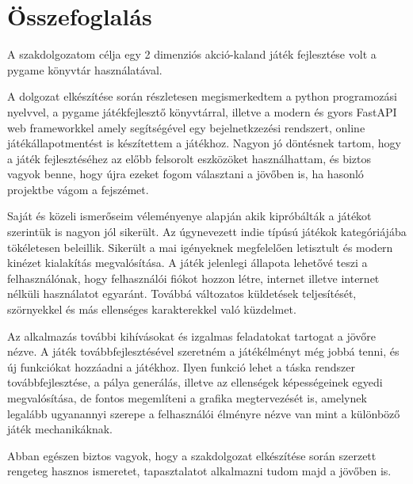 \chapter{Összefoglalás}

A szakdolgozatom célja egy 2 dimenziós akció-kaland játék fejlesztése volt a pygame könyvtár használatával.

A dolgozat elkészítése során részletesen megismerkedtem a python programozási nyelvvel, a pygame játékfejlesztő könyvtárral, illetve a modern és gyors FastAPI web frameworkkel amely segítségével egy bejelnetkzezési rendszert, online játékállapotmentést is készítettem a játékhoz. Nagyon jó döntésnek tartom, hogy a játék fejlesztéséhez az előbb felsorolt eszközöket használhattam, és biztos vagyok benne, hogy újra ezeket fogom választani a jövőben is, ha hasonló projektbe vágom a fejszémet.

Saját és közeli ismerőseim véleményenye alapján akik kipróbálták a játékot szerintük is nagyon jól sikerült. Az úgynevezett indie típúsú játékok kategóriájába tökéletesen beleillik. Sikerült a mai igényeknek megfelelően letisztult és modern kinézet kialakítás megvalósítása. A játék jelenlegi állapota lehetővé teszi a felhasználónak, hogy felhasználói fiókot hozzon létre, internet illetve internet nélküli használatot egyaránt. Továbbá változatos küldetések teljesítését, szörnyekkel és más ellenséges karakterekkel való küzdelmet.

Az alkalmazás további kihívásokat és izgalmas feladatokat tartogat a jövőre nézve. A játék továbbfejlesztésével szeretném a játékélményt még jobbá tenni, és új funkciókat hozzáadni a játékhoz. Ilyen funkció lehet a táska rendszer továbbfejlesztése, a pálya generálás, illetve az ellenségek képességeinek egyedi megvalósítása, de fontos megemlíteni a grafika megtervezését is, amelynek legalább ugyanannyi szerepe a felhasználói élményre nézve van mint a különböző játék mechanikáknak.  

Abban egészen biztos vagyok, hogy a szakdolgozat elkészítése során szerzett rengeteg hasznos ismeretet, tapasztalatot alkalmazni tudom majd a jövőben is.